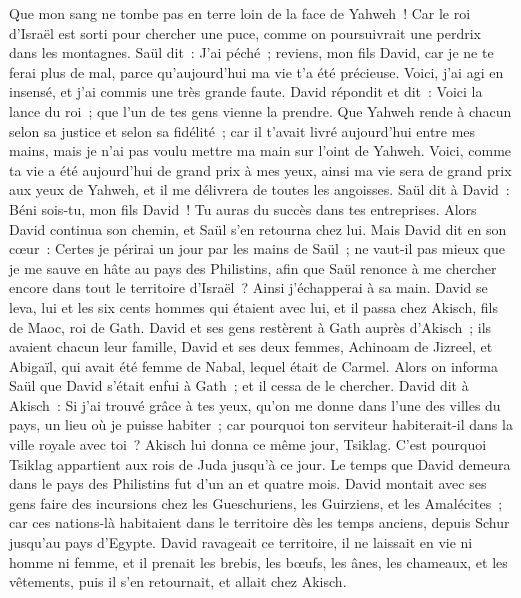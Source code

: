 \begin{multicols}{2}
Que mon sang ne tombe pas en terre loin de la face de Yahweh~! Car le roi d'Israël est sorti pour chercher une puce, comme on poursuivrait une perdrix dans les montagnes.
Saül dit~: J'ai péché~; reviens, mon fils David, car je ne te ferai plus de mal, parce qu'aujourd'hui ma vie t'a été précieuse. Voici, j'ai agi en insensé, et j'ai commis une très grande faute.
David répondit et dit~: Voici la lance du roi~; que l'un de tes gens vienne la prendre.
Que Yahweh rende à chacun selon sa justice et selon sa fidélité~; car il t'avait livré aujourd'hui entre mes mains, mais je n'ai pas voulu mettre ma main sur l'oint de Yahweh.
Voici, comme ta vie a été aujourd'hui de grand prix à mes yeux, ainsi ma vie sera de grand prix aux yeux de Yahweh, et il me délivrera de toutes les angoisses.
Saül dit à David~: Béni sois-tu, mon fils David~! Tu auras du succès dans tes entreprises. Alors David continua son chemin, et Saül s'en retourna chez lui.
\VerseOne{}Mais David dit en son cœur~: Certes je périrai un jour par les mains de Saül~; ne vaut-il pas mieux que je me sauve en hâte au pays des Philistins, afin que Saül renonce à me chercher encore dans tout le territoire d'Israël~? Ainsi j'échapperai à sa main.
David se leva, lui et les six cents hommes qui étaient avec lui, et il passa chez Akisch, fils de Maoc, roi de Gath.
David et ses gens restèrent à Gath auprès d'Akisch~; ils avaient chacun leur famille, David et ses deux femmes, Achinoam de Jizreel, et Abigaïl, qui avait été femme de Nabal, lequel était de Carmel.
Alors on informa Saül que David s'était enfui à Gath~; et il cessa de le chercher.
David dit à Akisch~: Si j'ai trouvé grâce à tes yeux, qu'on me donne dans l'une des villes du pays, un lieu où je puisse habiter~; car pourquoi ton serviteur habiterait-il dans la ville royale avec toi~?
Akisch lui donna ce même jour, Tsiklag. C'est pourquoi Tsiklag appartient aux rois de Juda jusqu'à ce jour.
Le temps que David demeura dans le pays des Philistins fut d'un an et quatre mois.
David montait avec ses gens faire des incursions chez les Gueschuriens, les Guirziens, et les Amalécites~; car ces nations-là habitaient dans le territoire dès les temps anciens, depuis Schur jusqu'au pays d'Egypte.
David ravageait ce territoire, il ne laissait en vie ni homme ni femme, et il prenait les brebis, les bœufs, les ânes, les chameaux, et les vêtements, puis il s'en retournait, et allait chez Akisch.

\end{multicols}
